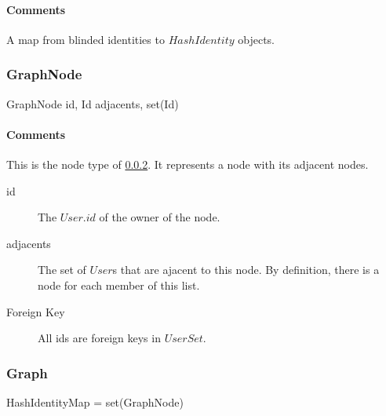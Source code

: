 \documentclass[a4paper,10pt]{article}
\begin{document}
\begin{inparaitem}[ ]
 \item \secure
 \item \persistent
 \item \unique
\end{inparaitem}

\paragraph*{Comments}
A map from blinded identities to $HashIdentity$ objects.

\subsubsection{GraphNode}

\begin{verbbox}
GraphNode
{
  id, Id
  adjacents, set(Id)
}
\end{verbbox}
\begin{center}
\theverbbox
\end{center}

\begin{inparaitem}[ ]
 \item \infrastructure
\end{inparaitem}

\paragraph*{Comments}
This is the node type of \ref{sec:structure:server:graph}. It represents a node with its adjacent nodes.

\SpecialItem
\begin{description}
 \item[id] The $User.id$ of the owner of the node.
 \item[adjacents] The set of $User$s that are ajacent to this node. By definition, there is a node for each member of this list.
\end{description}

\SpecialItem
\begin{description}
 \item[Foreign Key] All ids are foreign keys in $UserSet$.
\end{description}

\subsubsection{Graph}
\label{sec:structure:server:graph}
\begin{verbbox}
HashIdentityMap = set(GraphNode)
\end{verbbox}
\begin{center}
\theverbbox
\end{center}
\end{document}
